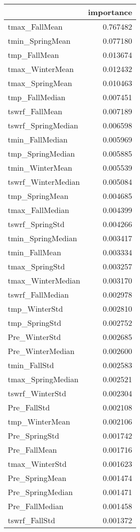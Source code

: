\begin{tabular}{lr}
\toprule
 & importance \\
\midrule
tmax_FallMean & 0.767482 \\
tmin_SpringMean & 0.077180 \\
tmp_FallMean & 0.013674 \\
tmax_WinterMean & 0.012432 \\
tmax_SpringMean & 0.010463 \\
tmp_FallMedian & 0.007451 \\
tswrf_FallMean & 0.007189 \\
tswrf_SpringMedian & 0.006598 \\
tmin_FallMedian & 0.005969 \\
tmp_SpringMedian & 0.005885 \\
tmin_WinterMean & 0.005539 \\
tswrf_WinterMedian & 0.005084 \\
tmp_SpringMean & 0.004685 \\
tmax_FallMedian & 0.004399 \\
tswrf_SpringStd & 0.004266 \\
tmin_SpringMedian & 0.003417 \\
tmin_FallMean & 0.003334 \\
tmax_SpringStd & 0.003257 \\
tmax_WinterMedian & 0.003170 \\
tswrf_FallMedian & 0.002978 \\
tmp_WinterStd & 0.002810 \\
tmp_SpringStd & 0.002752 \\
Pre_WinterStd & 0.002685 \\
Pre_WinterMedian & 0.002600 \\
tmin_FallStd & 0.002583 \\
tmax_SpringMedian & 0.002521 \\
tswrf_WinterStd & 0.002304 \\
Pre_FallStd & 0.002108 \\
tmp_WinterMean & 0.002106 \\
Pre_SpringStd & 0.001742 \\
Pre_FallMean & 0.001716 \\
tmax_WinterStd & 0.001623 \\
Pre_SpringMean & 0.001474 \\
Pre_SpringMedian & 0.001471 \\
Pre_FallMedian & 0.001458 \\
tswrf_FallStd & 0.001372 \\

\end{tabular}
